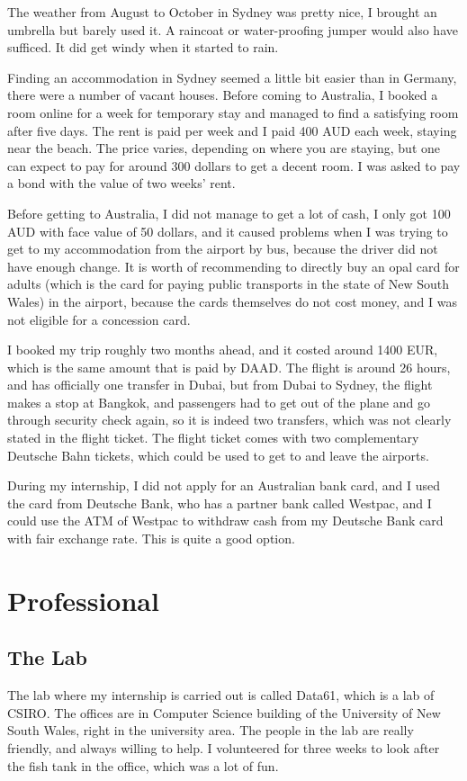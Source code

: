 \documentclass[adraft]{eptcs}
\begin{document}
The weather from August to October in Sydney was pretty nice, I brought an umbrella but barely used it. A raincoat or water-proofing jumper would also have sufficed. It did get windy when it started to rain.

Finding an accommodation in Sydney seemed a little bit easier than in Germany, there were a number of vacant houses. Before coming to Australia, I booked a room online for a week for temporary stay and managed to find a satisfying room after five days. The rent is paid per week and I paid 400 AUD each week, staying near the beach. The price varies, depending on where you are staying, but one can expect to pay for around 300 dollars to get a decent room. I was asked to pay a bond with the value of two weeks' rent.

Before getting to Australia, I did not manage to get a lot of cash, I only got 100 AUD with face value of 50 dollars, and it caused problems when I was trying to get to my accommodation from the airport by bus, because the driver did not have enough change. It is worth of recommending to directly buy an opal card for adults (which is the card for paying public transports in the state of New South Wales) in the airport, because the cards themselves do not cost money, and I was not eligible for a concession card.

I booked my trip roughly two months ahead, and it costed around 1400 EUR, which is the same amount that is paid by DAAD. The flight is around 26 hours, and has officially one transfer in Dubai, but from Dubai to Sydney, the flight makes a stop at Bangkok, and passengers had to get out of the plane and go through security check again, so it is indeed two transfers, which was not clearly stated in the flight ticket. The flight ticket comes with two complementary Deutsche Bahn tickets, which could be used to get to and leave the airports.

During my internship, I did not apply for an Australian bank card, and I used the card from Deutsche Bank, who has a partner bank called Westpac, and I could use the ATM of Westpac to withdraw cash from my Deutsche Bank card with fair exchange rate. This is quite a good option.


\section{Professional}
\subsection{The Lab}
The lab where my internship is carried out is called Data61, which is a lab of CSIRO. The offices are in Computer Science building of the University of New South Wales, right in the university area. The people in the lab are really friendly, and always willing to help. I volunteered for three weeks to look after the fish tank in the office, which was a lot of fun.
\end{document}
